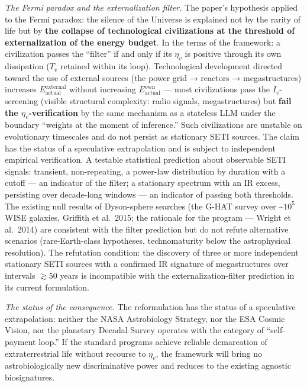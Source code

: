 \documentclass[pdflatex,sn-mathphys-ay]{sn-jnl}
\begin{document}
\emph{The Fermi paradox and the externalization filter.} The paper's hypothesis applied to the Fermi paradox: the silence of the Universe is explained not by the rarity of life but by \textbf{the collapse of technological civilizations at the threshold of externalization of the energy budget}. In the terms of the framework: a civilization passes the ``filter'' if and only if its \(\eta_v\) is positive through its own dissipation (\(T_v\) retained within its loop). Technological development directed toward the use of external sources (the power grid → reactors → megastructures) increases \(E_{\text{actual}}^{\text{external}}\) without increasing \(E_{\text{actual}}^{\text{own}}\) --- most civilizations pass the \(I_v\)-screening (visible structural complexity: radio signals, megastructures) but \textbf{fail the \(\eta_v\)-verification} by the same mechanism as a stateless LLM under the boundary ``weights at the moment of inference.'' Such civilizations are unstable on evolutionary timescales and do not persist as stationary SETI sources. The claim has the status of a speculative extrapolation and is subject to independent empirical verification. A testable statistical prediction about observable SETI signals: transient, non-repeating, a power-law distribution by duration with a cutoff --- an indicator of the filter; a stationary spectrum with an IR excess, persisting over decade-long windows --- an indicator of passing both thresholds. The existing null results of Dyson-sphere searches (the G-HAT survey over \textasciitilde{}\(10^5\) WISE galaxies, Griffith et al.~2015; the rationale for the program --- Wright et al.~2014) are consistent with the filter prediction but do not refute alternative scenarios (rare-Earth-class hypotheses, technomaturity below the astrophysical resolution). The refutation condition: the discovery of three or more independent stationary SETI sources with a confirmed IR signature of megastructures over intervals \(\gtrsim 50\) years is incompatible with the externalization-filter prediction in its current formulation.

\emph{The status of the consequence.} The reformulation has the status of a speculative extrapolation: neither the NASA Astrobiology Strategy, nor the ESA Cosmic Vision, nor the planetary Decadal Survey operates with the category of ``self-payment loop.'' If the standard programs achieve reliable demarcation of extraterrestrial life without recourse to \(\eta_v\), the framework will bring no astrobiologically new discriminative power and reduces to the existing agnostic biosignatures.
\end{document}
